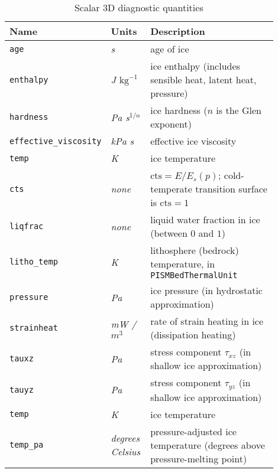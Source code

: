 \begin{table}[ht]
  \centering
  \begin{tabular}{p{0.15\linewidth}p{0.15\linewidth}p{0.6\linewidth}}
    \toprule
    \textbf{Name} & \textbf{Units} & \textbf{Description} \\
    \midrule
    \texttt{age} & \textsl{s} & age of ice \\
    \texttt{enthalpy} & \textsl{J $\mathrm{kg}^{-1}$} & ice enthalpy (includes sensible heat, latent heat, pressure) \\
    \texttt{hardness} & \textsl{Pa s$^{1/n}$} & ice hardness ($n$ is the Glen exponent) \\
    \texttt{effective_viscosity} & \textsl{kPa s} & effective ice viscosity \\
    \texttt{temp} & \textsl{K} & ice temperature \\
    \texttt{cts} & \textsl{none} &  $\mathrm{cts} = E/E_s(p)$; cold-temperate transition surface is $\mathrm{cts} = 1$ \\
    \texttt{liqfrac} & \textsl{none} &  liquid water fraction in ice (between $0$ and $1$) \\
    \texttt{litho_temp} & \textsl{K} & lithosphere (bedrock) temperature, in \texttt{PISMBedThermalUnit} \\
    \texttt{pressure} & \textsl{Pa} &  ice pressure (in hydrostatic approximation) \\
    \texttt{strainheat} & \textsl{mW / $m^3$} & rate of strain heating in ice (dissipation heating) \\
    \texttt{tauxz} & \textsl{Pa} &  stress component $\tau_{xz}$ (in shallow ice approximation) \\
    \texttt{tauyz} & \textsl{Pa} &  stress component $\tau_{yz}$ (in shallow ice approximation) \\
    \texttt{temp} & \textsl{K} &  ice temperature \\
    \texttt{temp_pa} & \textsl{degrees Celsius} &  pressure-adjusted ice temperature (degrees above pressure-melting point) \\
    \bottomrule
  \end{tabular}
\caption{Scalar 3D diagnostic quantities}
\label{tab:three-d-diagnostics}
\end{table}

